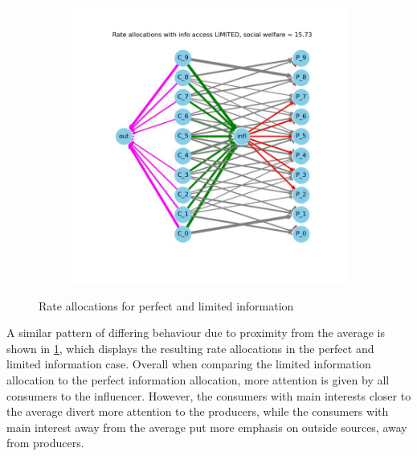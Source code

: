 \documentclass[11pt, letterpaper]{article}
\begin{document}
\begin{figure}[h]
\begin{adjustbox}{max width=1.5\textwidth,center}
\begin{subfigure}[b]{0.6\textwidth}
            \includegraphics[width=\linewidth]{"figures/lim/2_allocs.jpg"}
        \end{subfigure}
    \end{adjustbox}
\caption{Rate allocations for perfect and limited information}
\label{fig:lim_allocs}
\end{figure}

A similar pattern of differing behaviour due to proximity from the average is shown in \cref{fig:lim_allocs}, which displays the resulting rate allocations in the perfect and limited information case. Overall when comparing the limited information allocation to the perfect information allocation, more attention is given by all consumers to the influencer. However, the consumers with main interests closer to the average divert more attention to the producers, while the consumers with main interest away from the average put more emphasis on outside sources, away from producers. 
\end{document}
